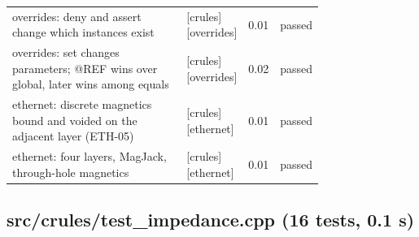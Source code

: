 \begin{longtable}{@{}p{0.57\linewidth}p{0.19\linewidth}rl@{}}
overrides: deny and assert change which instances exist & {\footnotesize [crules][overrides]} & 0.01 & passed \\
overrides: set changes parameters; @REF wins over global, later wins among equals & {\footnotesize [crules][overrides]} & 0.02 & passed \\
ethernet: discrete magnetics bound and voided on the adjacent layer (ETH-05) & {\footnotesize [crules][ethernet]} & 0.01 & passed \\
ethernet: four layers, MagJack, through-hole magnetics & {\footnotesize [crules][ethernet]} & 0.01 & passed \\
\bottomrule\end{longtable}
\subsection*{src/\allowbreak{}crules/\allowbreak{}test\_\allowbreak{}impedance.cpp (16 tests, 0.1 s)}
